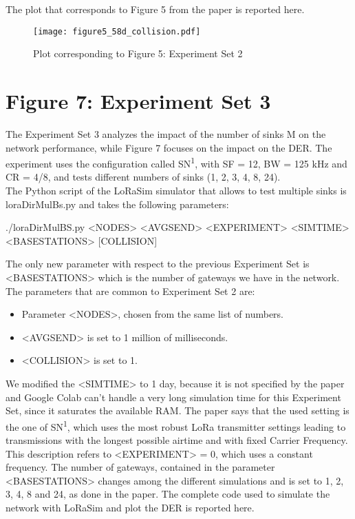 The plot that corresponds to Figure 5 from the paper is reported here.

\begin{figure}[H]
    \centering
    \texttt{[image: figure5\_58d\_collision.pdf]}
    \caption{Plot corresponding to Figure 5: Experiment Set 2}
\end{figure}

\section{Figure 7: Experiment Set 3}
The Experiment Set 3 analyzes the impact of the number of sinks M on the network performance, while Figure 7 focuses on the impact on the DER. The experiment uses the configuration called SN\textsuperscript{1}, with SF = 12, BW = 125 kHz and CR = 4/8, and tests different numbers of sinks (1, 2, 3, 4, 8, 24).\\
The Python script of the LoRaSim simulator that allows to test multiple sinks is loraDirMulBs.py and takes the following parameters:
\begin{BreakableVerbatim}
./loraDirMulBS.py <NODES> <AVGSEND> <EXPERIMENT> <SIMTIME> <BASESTATIONS> [COLLISION]
\end{BreakableVerbatim}
The only new parameter with respect to the previous Experiment Set is <BASESTATIONS> which is the number of gateways we have in the network. 
The parameters that are common to Experiment Set 2 are: 
\begin{itemize}
\item Parameter <NODES>, chosen from the same list of numbers.
\item <AVGSEND> is set to 1 million of milliseconds.
\item <COLLISION> is set to 1.
\end{itemize}
We modified the <SIMTIME> to 1 day, because it is not specified by the paper and Google Colab can't handle a very long simulation time for this Experiment Set, since it saturates the available RAM. The paper says that the used setting is the one of SN\textsuperscript{1}, which uses the most robust LoRa transmitter settings leading to transmissions with the longest possible airtime and with fixed Carrier Frequency. This description refers to <EXPERIMENT> = 0, which uses a constant frequency. The number of gateways, contained in the parameter <BASESTATIONS> changes among the different simulations and is set to 1, 2, 3, 4, 8 and 24, as done in the paper.
The complete code used to simulate the network with LoRaSim and plot the DER is reported here.

